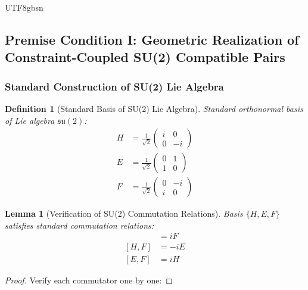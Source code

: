 \documentclass[a4paper,12pt]{extarticle}
\newtheorem{lemma}[theorem]{Lemma}
\newtheorem{definition}[theorem]{Definition}
\theoremstyle{definition}
\begin{document}
\begin{CJK}{UTF8}{gbsn}
\subsection{Premise Condition I: Geometric Realization of Constraint-Coupled SU(2) Compatible Pairs}
\label{subsec:premise_I_su2_compatible_pair}

\subsubsection{Standard Construction of SU(2) Lie Algebra}
\label{subsubsec:su2_lie_algebra}

\begin{definition}[Standard Basis of SU(2) Lie Algebra]
\label{def:su2_standard_basis}
Standard orthonormal basis of Lie algebra $\mathfrak{su}(2)$:
\begin{align}
H &= \frac{1}{\sqrt{2}}\begin{pmatrix} i & 0 \\ 0 & -i \end{pmatrix} \label{eq:su2_H}\\
E &= \frac{1}{\sqrt{2}}\begin{pmatrix} 0 & 1 \\ 1 & 0 \end{pmatrix} \label{eq:su2_E}\\
F &= \frac{1}{\sqrt{2}}\begin{pmatrix} 0 & -i \\ i & 0 \end{pmatrix} \label{eq:su2_F}
\end{align}
\end{definition}

\begin{lemma}[Verification of SU(2) Commutation Relations]
\label{lem:su2_commutation_verification}
Basis $\{H, E, F\}$ satisfies standard commutation relations:
\begin{align}
[H, E] &= iF \label{eq:comm_HE}\\
[H, F] &= -iE \label{eq:comm_HF}\\
[E, F] &= iH \label{eq:comm_EF}
\end{align}
\end{lemma}

\begin{proof}
Verify each commutator one by one:


\end{proof}
\end{CJK}
\end{document}
